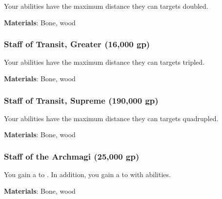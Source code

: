 Your  abilities have the maximum distance they can  targets doubled.



\vspace{0.25em}
\textbf{Materials}: Bone, wood


\lowercase{\hypertarget{item:Staff of Transit, Greater}{}}\label{item:Staff of Transit, Greater}
\hypertarget{item:Staff of Transit, Greater}{\subsubsection{Staff of Transit, Greater\hfill{} (16,000 gp)}}

Your  abilities have the maximum distance they can  targets tripled.



\vspace{0.25em}
\textbf{Materials}: Bone, wood


\lowercase{\hypertarget{item:Staff of Transit, Supreme}{}}\label{item:Staff of Transit, Supreme}
\hypertarget{item:Staff of Transit, Supreme}{\subsubsection{Staff of Transit, Supreme\hfill{} (190,000 gp)}}

Your  abilities have the maximum distance they can  targets quadrupled.



\vspace{0.25em}
\textbf{Materials}: Bone, wood


\lowercase{\hypertarget{item:Staff of the Archmagi}{}}\label{item:Staff of the Archmagi}
\hypertarget{item:Staff of the Archmagi}{\subsubsection{Staff of the Archmagi\hfill{} (25,000 gp)}}

You gain a   to .
In addition, you gain a   to  with  abilities.



\vspace{0.25em}
\textbf{Materials}: Bone, wood


